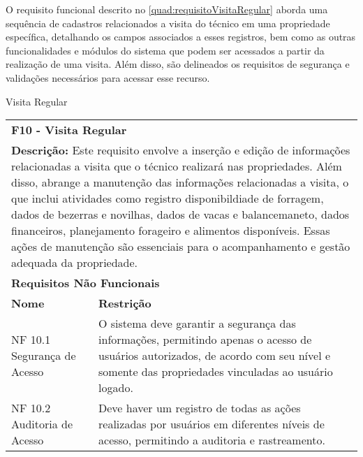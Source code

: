 O requisito funcional descrito no \autoref{quad:requisitoVisitaRegular}  aborda uma sequência de cadastros relacionados a visita do técnico em uma propriedade específica, detalhando os campos associados a esses registros, bem como as outras funcionalidades e módulos do sistema que podem ser acessados a partir da realização de uma visita. Além disso, são delineados os requisitos de segurança e validações necessários para acessar esse recurso.

\begin{tabframed}[htb]
  \caption{Visita Regular}
  \label{quad:requisitoVisitaRegular}
  \renewcommand{\arraystretch}{1.5}
  \begin{tabular}{|l|l|}
    \cline{1-2}
    \multicolumn{2}{|l|}{\textbf{F10 - Visita Regular}}
    \\ \cline{1-2}

    \multicolumn{2}{|p{15cm}|}{
    \raggedright \textbf{Descrição:} Este requisito envolve a inserção e edição de informações relacionadas a visita que o técnico realizará nas propriedades.
    Além disso, abrange a manutenção das informações relacionadas a  visita, o que inclui atividades como registro disponibildiade de forragem, dados de bezerras e novilhas, dados de vacas e balancemaneto, dados financeiros, planejamento forageiro e alimentos disponíveis. Essas ações de manutenção são essenciais para o acompanhamento e gestão adequada da propriedade.
    }
    \\ \cline{1-2}

    \multicolumn{2}{|l|}{\textbf{Requisitos Não Funcionais}}
    \\ \cline{1-2}

    \textbf{Nome}                             &
    \textbf{Restrição}
    \\ \cline{1-2}

    \multicolumn{1}{|p{3cm}|}{\raggedright NF 10.1 Segurança de Acesso} &
    \multicolumn{1}{|p{12cm}|}{\raggedright O sistema deve garantir a segurança das informações, permitindo apenas o acesso de usuários autorizados, de acordo com seu nível e somente das propriedades vinculadas ao usuário logado.}
    \\ \cline{1-2}

    \multicolumn{1}{|p{3cm}|}{\raggedright NF 10.2 Auditoria de Acesso}               &
    \multicolumn{1}{|p{12cm}|}{\raggedright Deve haver um registro de todas as ações realizadas por usuários em diferentes níveis de acesso, permitindo a auditoria e rastreamento.}
    \\ \cline{1-2}


\end{tabular}
\end{tabframed}
